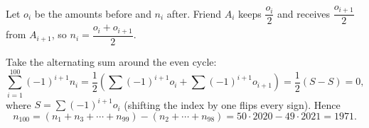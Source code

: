 Let $o_i$ be the amounts before and $n_i$ after. Friend $A_i$ keeps $\dfrac{o_i}2$ and receives $\dfrac{o_{i+1}}2$ from $A_{i+1}$, so $n_i=\dfrac{o_i+o_{i+1}}2$.

Take the alternating sum around the even cycle:
\[\sum_{i=1}^{100}(-1)^{i+1}n_i=\dfrac12\left(\sum(-1)^{i+1}o_i+\sum(-1)^{i+1}o_{i+1}\right)=\dfrac12\left(S-S\right)=0,\]
where $S=\sum(-1)^{i+1}o_i$ (shifting the index by one flips every sign). Hence
\[n_{100}=(n_1+n_3+\cdots+n_{99})-(n_2+\cdots+n_{98})=50\cdot2020-49\cdot2021=\boxed{1971}.\]
